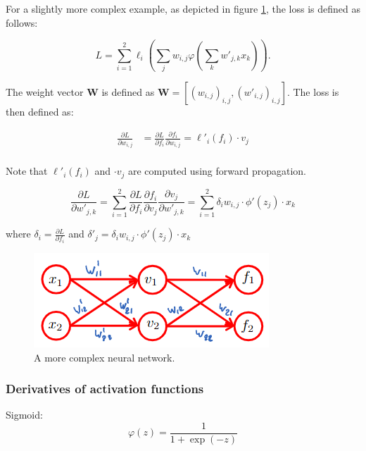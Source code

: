 \documentclass[a4paper,10pt,twoside]{article}
\begin{document}
For a slightly more complex example, as depicted in figure \ref{aan-loss-more-complex-example}, the loss is defined as follows:

\begin{equation*}
    L = \sum_{i=1}^{2}\ell_i(\sum_{j}w_{i,j} \varphi(\sum_{k}w'_{j,k} x_k)).
\end{equation*}

The weight vector $\mathbf{W}$ is defined as $\mathbf{W} = [(w_{i,j})_{i,j},(w'_{i,j})_{i,j}]$. The loss is then defined as:

\begin{align*}
    \frac{\partial L}{\partial w_{i,j}}&=\frac{\partial L}{\partial f_{i}}\frac{\partial f_{i}}{\partial w_{i,j}}=\ell'_i(f_i)\cdot v_j\\
\end{align*}

Note that $\ell'_i(f_i)$ and $\cdot v_j$ are computed using forward propagation.

\begin{equation*}
    \frac{\partial L}{\partial w'_{j,k}}=\sum_{i=1}^{2}\frac{\partial L}{\partial f_{i}}\frac{\partial f_i}{\partial v_j}\frac{\partial v_j}{\partial w'_{j,k}}=\sum_{i=1}^{2}\delta_i w_{i,j}\cdot\phi'(z_j)\cdot x_k
\end{equation*}

where $\delta_i=\frac{\partial L}{\partial f_{i}}$ and $\delta '_j=\delta_i w_{i,j}\cdot\phi'(z_j)\cdot x_k$

\begin{figure}
    \centering
    \includegraphics[width=.5\textwidth]{figures/aan-loss-more-complex-example.png}
    \caption{A more complex neural network.}
    \label{aan-loss-more-complex-example}
\end{figure}

\subsubsection{Derivatives of activation functions}

Sigmoid:
\begin{equation*}
    \varphi(z)=\frac{1}{1+\exp(-z)}
\end{equation*}
\end{document}
